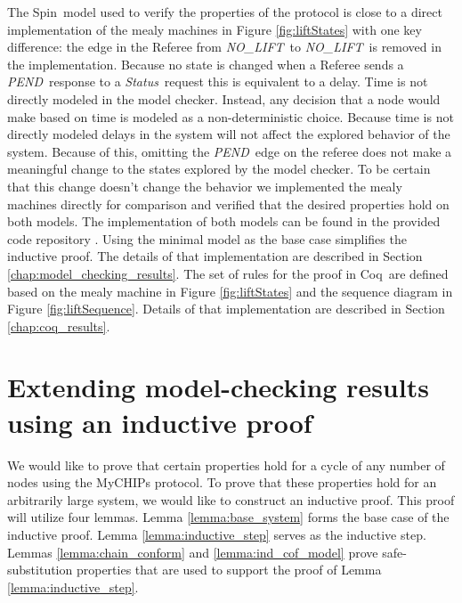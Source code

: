 \documentclass[runningheads]{llncs}
\newcommand{\nolift}{\emph{NO\_LIFT}}
\newcommand{\pend}{\emph{PEND}}
\newcommand{\status}{\emph{Status}}
\newcommand{\figref}[1]{Figure \ref{#1}}
\newcommand{\secref}[1]{Section \ref{#1}}
\newcommand{\spin}{Spin}
\newcommand{\coq}{Coq}
\newcommand{\coderepository}{provided code repository \cite{Storey_Extending_Model_Checking_2023}}
\newif\ifcomments
\newcommand{\egm}[1]{\ifcomments\textcolor{orange}{egm: #1}\fi}
\begin{document}
The \spin\ model used to verify the properties of the protocol is close to a direct implementation of the mealy machines in \figref{fig:liftStates} with one key difference: the edge in the Referee from \nolift\ to \nolift\ is removed in the implementation. Because no state is changed when a Referee sends a \pend\ response to a \status\ request this is equivalent to a delay. Time is not directly modeled in the model checker. Instead, any decision that a node would make based on time is modeled as a non-deterministic choice. Because time is not directly modeled delays in the system will not affect the explored behavior of the system. Because of this, omitting the \pend\ edge on the referee does not make a meaningful change to the states explored by the model checker. To be certain that this change doesn't change the behavior we implemented the mealy machines directly for comparison and verified that the desired properties hold on both models. The implementation of both models can be found in the \coderepository. Using the minimal model as the base case simplifies the inductive proof. 
The details of that implementation are described in \secref{chap:model_checking_results}. The set of rules for the proof in \coq\ are defined based on the mealy machine in \figref{fig:liftStates} and the sequence diagram in 
 \figref{fig:liftSequence}. Details of that implementation are described in \secref{chap:coq_results}.
 
\section{Extending model-checking results using an inductive proof}
\label{sec:extending}

\egm{Create a \emph{\textbackslash lemmaRef} macro for referring to Lemmas. Replace everywhere.}

We would like to prove that certain properties hold for a cycle of any number of nodes using the MyCHIPs protocol.
To prove that these properties hold for an arbitrarily large system, we would like to construct an inductive proof. This proof will utilize four lemmas. Lemma \ref{lemma:base_system} forms the base case of the inductive proof. Lemma \ref{lemma:inductive_step} serves as the inductive step. Lemmas \ref{lemma:chain_conform} and \ref{lemma:ind_cof_model}  prove safe-substitution properties that are used to support the proof of Lemma \ref{lemma:inductive_step}.
\end{document}
